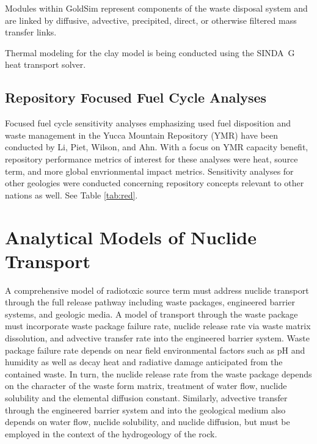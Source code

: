 Modules within GoldSim represent components of the waste disposal 
system and are linked by diffusive, advective, precipited, direct, or  
otherwise filtered mass transfer links.

Thermal modeling for the clay model is being conducted using the 
SINDA\ G heat transport solver.  

\subsection{Repository Focused Fuel Cycle Analyses}

Focused fuel cycle sensitivity analyses emphasizing used fuel 
disposition and waste management in the Yucca Mountain Repository 
(YMR) have been conducted by Li, Piet, Wilson, and Ahn. With a focus 
on YMR capacity benefit, repository performance metrics of interest 
for these analyses were heat, source term, and more global 
envrionmental impact metrics.  Sensitivity analyses for other 
geologies were conducted concerning repository concepts relevant to 
other nations as well. See Table \ref{tab:red}.

\section{Analytical Models of Nuclide Transport} 
\label{sec:analytical_nuc}


A comprehensive model of radiotoxic source term must address nuclide 
transport through the full release pathway including waste packages, 
engineered barrier systems, and geologic media. A model of transport 
through the waste package must incorporate waste package failure rate, 
nuclide release rate via waste matrix dissolution, and advective 
transfer rate into the engineered barrier system.  Waste package 
failure rate depends on near field environmental factors such as pH 
and humidity as well as decay heat and radiative damage anticipated 
from the contained waste.  In turn, the nuclide release rate from the 
waste package depends on the character of the waste form matrix, 
treatment of water flow, nuclide solubility and the elemental 
diffusion constant.  Similarly, advective transfer through the 
engineered barrier system and into the geological medium also depends 
on water flow, nuclide solubility, and nuclide diffusion, but must be 
employed in the context of the hydrogeology of the rock.   

